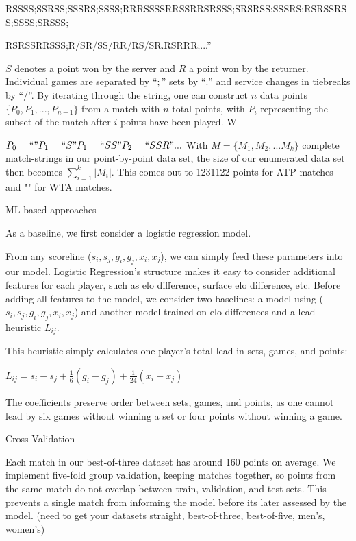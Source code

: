 \documentclass[11pt]{article}
\begin{document}
RSSSS;SSRSS;SSSRS;SSSS;RRRSSSSRRSSRRSRSSS;SRSRSS;SSSRS;RSRSSRSS;SSSS;SRSSS;

RSRSSRRSSS;R/SR/SS/RR/RS/SR.RSRRR;...''

$S$ denotes a point won by the server and $R$ a point won by the returner. Individual games are separated by ``$;$'' sets by ``$.$'' and service changes in tiebreaks by ``$/$''. By iterating through the string, one can construct $n$ data points $\{P_0,P_1,...,P_{n-1}\}$ from a match with $n$ total points, with $P_i$ representing the subset of the match after $i$ points have been played. W

$P_0 = ``"
\newline
P_1 = ``S"
\newline
P_1 = ``SS"
\newline
P_2 = ``SSR"
\newline
...
\newline$
With $M = \{M_1,M_2,...M_k\}$ complete match-strings in our point-by-point data set, the size of our enumerated data set then becomes $\sum_{i=1}^k |M_i|$. This comes out to 1231122 points for ATP matches and "" for WTA matches.



\item ML-based approaches

As a baseline, we first consider a logistic regression model. 

From any scoreline  ($s_i,s_j,g_i,g_j,{x}_i,{x}_j$), we can simply feed these parameters into our model. Logistic Regression's structure makes it easy to consider additional features for each player, such as elo difference, surface elo difference, etc. Before adding all features to the model, we consider two baselines: a model using ($s_i,s_j,g_i,g_j,{x}_i,{x}_j$) and another model trained on elo differences and a lead heuristic $L_{ij}$.

This heuristic simply calculates one player's total lead in sets, games, and points:

$L_{ij} = s_i-s_j + \frac{1}{6}(g_i-g_j) + \frac{1}{24}(x_i-x_j)$

The coefficients preserve order between sets, games, and points, as one cannot lead by six games without winning a set or four points without winning a game.

Cross Validation

Each match in our best-of-three dataset has around 160 points on average. We implement five-fold group validation, keeping matches together, so points from the same match do not overlap between train, validation, and test sets. This prevents a single match from informing the model before its later assessed by the model. (need to get your datasets straight, best-of-three, best-of-five, men's, women's)
\end{document}
